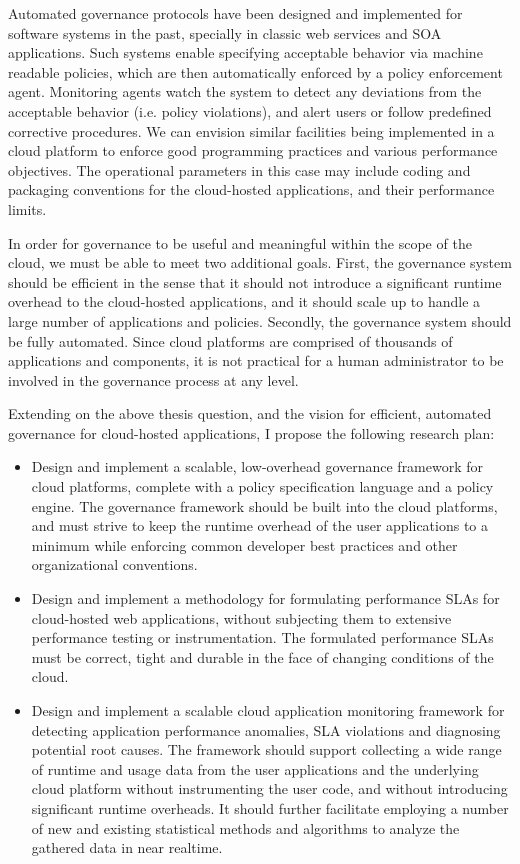 Automated governance protocols have been designed and implemented for software systems in
the past, specially in classic web services and SOA applications. Such systems enable specifying
acceptable behavior via machine readable policies, which are then automatically enforced by
a policy enforcement agent. Monitoring agents watch the system to detect any deviations from
the acceptable behavior (i.e. policy violations), and alert users or follow predefined corrective
procedures. We can envision similar facilities being implemented in a cloud platform to 
enforce good programming practices and various performance objectives. The operational
parameters in this case may include coding and packaging conventions for the cloud-hosted
applications, and their performance limits.

In order for governance to be
useful and meaningful within the scope of the cloud, we must be able to meet two additional
goals. First, the governance system should be efficient in the sense that it should not introduce
a significant runtime overhead to the cloud-hosted applications, and it should scale up to
handle a large number of applications and policies. Secondly, the governance system should be
fully automated. Since cloud platforms are comprised of thousands of applications and components,
it is not practical for a human administrator to be involved in the governance process at any level.

Extending on the above thesis question, and the vision for efficient, automated governance for
cloud-hosted applications, I propose the following research plan:

\begin{itemize}
\item Design and implement a scalable, low-overhead governance framework for cloud platforms,
complete with a policy specification language and a policy engine. The governance framework should be
built into the cloud platforms, and must
strive to keep the runtime overhead of the user applications to a minimum while enforcing
common developer best practices and other organizational conventions.
\item Design and implement a methodology for formulating performance SLAs for cloud-hosted 
 web applications, without
 subjecting them to extensive performance testing or instrumentation. The formulated
 performance SLAs must be correct, tight and durable in the face of changing
 conditions of the cloud.
 \item Design and implement a scalable cloud application monitoring framework for detecting
application performance anomalies, SLA violations and diagnosing potential root causes. 
The framework should support collecting
 a wide range of runtime and usage data from the user applications and the underlying cloud platform
 without instrumenting the user code, and without introducing significant runtime overheads.
 It should further facilitate employing a number of new and existing statistical methods
 and algorithms to analyze the gathered data in near realtime.
\end{itemize}

